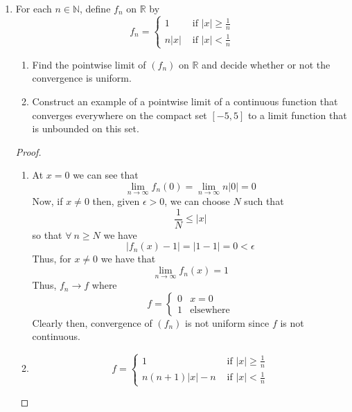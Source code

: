 \begin{enumerate}
    \item For each \( n \in \mathbb{N} \), define \( f_n \) on \( \mathbb{R} \) by
    \[
    f_n = \begin{cases} 1 & \text{ if } \vert x \vert \geq \frac{1}{n} \\ n\vert x \vert & \text{ if } \vert x \vert < \frac{1}{n}\end{cases}
    \]
    \begin{enumerate}
        \item Find the pointwise limit of \( (f_n) \) on \( \mathbb{R} \) and decide whether or not the convergence is uniform.
        \item Construct an example of a pointwise limit of a continuous function that converges everywhere on the compact set \([-5,5] \) to a limit function that is unbounded on this set.
    \end{enumerate}
    
    \begin{proof}
    \begin{enumerate}
        \item At \( x = 0 \) we can see that 
        \[
        \lim_{n \rightarrow \infty} f_n(0) = \lim_{n \rightarrow \infty} n \vert 0 \vert = 0 
        \]
        Now, if \( x \neq 0 \) then, given \( \epsilon > 0 \), we can choose \( N \) such that 
        \[
        \frac{1}{N} \leq \vert x \vert
        \]
        so that \( \forall \: n \geq N \) we have
        \[
        \vert f_n(x) - 1 \vert = \vert 1 - 1 \vert = 0 < \epsilon
        \]
        Thus, for \( x \neq 0 \) we have that
        \[
        \lim_{ n \rightarrow \infty} f_n(x) = 1
        \]
        Thus, \( f_n \rightarrow f \) where
        \[
        f = \begin{cases} 0 & x =0 \\ 1 & \text{elsewhere} \end{cases}
        \]
        Clearly then, convergence of \( (f_n) \) is not uniform since \( f \) is not continuous. 
        
        \item \[
        f = \begin{cases} 1 & \text{ if }\vert x \vert \geq \frac{1}{n} \\ n(n+1)\vert x \vert - n & \text{ if }\vert x \vert < \frac{1}{n} \end{cases}
        \]
    \end{enumerate}
    \end{proof}
    

\end{enumerate}

